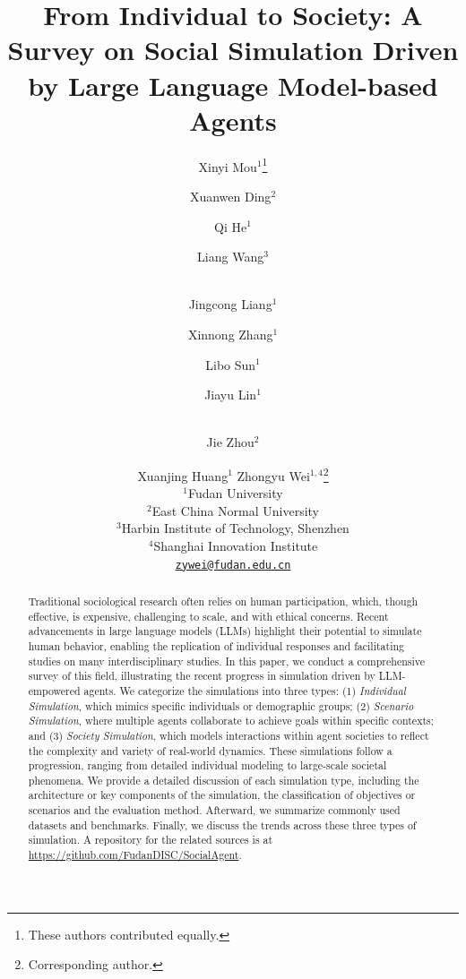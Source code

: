 \documentclass{article}
\title{From Individual to Society: A Survey on Social Simulation Driven by Large Language Model-based Agents}
\author{
Xinyi Mou$^1$\thanks{These authors contributed equally.}\and
Xuanwen Ding$^2$\footnotemark[1]\and
Qi He$^1$\footnotemark[1]\and
Liang Wang$^3$\footnotemark[1]\and\\
Jingcong Liang$^1$\and
Xinnong Zhang$^1$\and
Libo Sun$^1$\and
Jiayu Lin$^1$\and\\
Jie Zhou$^2$\and
Xuanjing Huang$^1$\And
Zhongyu Wei$^{1,4}$\thanks{Corresponding author.}
\\
\affiliations
$^1$Fudan University\\
$^2$East China Normal University\\
$^3$Harbin Institute of Technology, Shenzhen\\
$^4$Shanghai Innovation Institute\\
\emails
 \href{mailto:zywei@fudan.edu.cn}{\texttt{zywei@fudan.edu.cn}}
}
\begin{document}
\maketitle

\begin{abstract}
Traditional sociological research often relies on human participation, which, though effective, is expensive, challenging to scale, and with ethical concerns. Recent advancements in large language models (LLMs) highlight their potential to simulate human behavior, enabling the replication of individual responses and facilitating studies on many interdisciplinary studies. In this paper, we conduct a comprehensive survey of this field, illustrating the recent progress in simulation driven by LLM-empowered agents. We categorize the simulations into three types: (1) \textit{Individual Simulation}, which mimics specific individuals or demographic groups; (2) \textit{Scenario Simulation}, where multiple agents collaborate to achieve goals within specific contexts; and (3) \textit{Society Simulation}, which models interactions within agent societies to reflect the complexity and variety of real-world dynamics. These simulations follow a progression, ranging from detailed individual modeling to large-scale societal phenomena. We provide a detailed discussion of each simulation type, including the architecture or key components of the simulation, the classification of objectives or scenarios and the evaluation method. Afterward, we summarize commonly used datasets and benchmarks. Finally, we discuss the trends across these three types of simulation. A repository for the related sources is at {\url{https://github.com/FudanDISC/SocialAgent}}.
\end{abstract}

















% 


\end{document}
